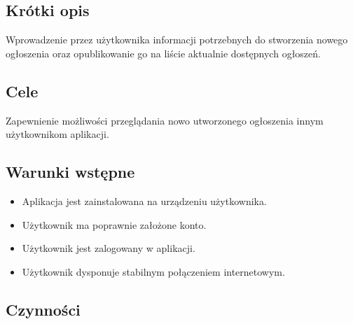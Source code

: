 \documentclass[licencjacka]{pracamgr}
\begin{document}
    \subsection{Krótki opis}
    Wprowadzenie przez użytkownika informacji potrzebnych do stworzenia nowego ogłoszenia oraz opublikowanie go na liście aktualnie dostępnych
    ogłoszeń.
    \subsection{Cele}
    Zapewnienie możliwości przeglądania nowo utworzonego ogłoszenia innym użytkownikom aplikacji.
    \subsection{Warunki wstępne}
    \begin{itemize}
        \item Aplikacja jest zainstalowana na urządzeniu użytkownika.
        \item Użytkownik ma poprawnie założone konto.
        \item Użytkownik jest zalogowany w aplikacji.
        \item Użytkownik dysponuje stabilnym połączeniem internetowym.
    \end{itemize}
    \subsection{Czynności}\label{r:czynnosci-link2}
\end{document}
